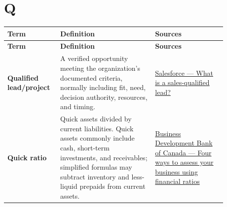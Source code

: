 \documentclass[11pt,letterpaper,oneside,openany]{book}
\begin{document}
\section[Q]{Q}
\begin{center}
\small
\setlength{\LTpre}{0.4em}
\setlength{\LTpost}{0.8em}
\begin{longtable}{>{\RaggedRight\arraybackslash}p{0.180\linewidth}>{\RaggedRight\arraybackslash}p{0.400\linewidth}>{\RaggedRight\arraybackslash}p{0.300\linewidth}}
\rowcolor{DeepNavy}
\color{white}\bfseries Term & \color{white}\bfseries Definition & \color{white}\bfseries Sources \\
\endfirsthead
\rowcolor{DeepNavy}
\color{white}\bfseries Term & \color{white}\bfseries Definition & \color{white}\bfseries Sources \\
\endhead
\textbf{Qualified lead/project} & A verified opportunity meeting the organization's documented criteria, normally including fit, need, decision authority, resources, and timing. & \href{https://www.salesforce.com/blog/sales/sales-qualified-lead/}{Salesforce --- What is a sales-qualified lead?} \\
\textbf{Quick ratio} & Quick assets divided by current liabilities. Quick assets commonly include cash, short-term investments, and receivables; simplified formulas may subtract inventory and less-liquid prepaids from current assets. & \href{https://www.bdc.ca/en/articles-tools/money-finance/manage-finances/financial-ratios-4-ways-assess-business}{Business Development Bank of Canada --- Four ways to assess your business using financial ratios} \\
\end{longtable}
\end{center}
\end{document}

